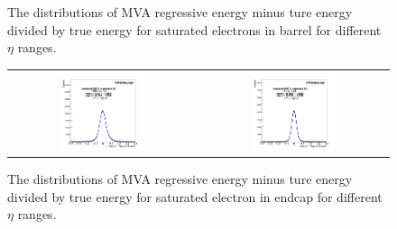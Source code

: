 \begin{figure}[bh]
\begin{center}
\begin{tabular}{cc}
    \end{tabular}
    \caption{ The distributions of MVA regressive energy minus ture energy divided by true energy for saturated electrons in barrel for different $\eta$ ranges.}
    \label{fig:result_B123}
  \end{center}
\end{figure}


\begin{figure}[bh]
  \begin{center}
    \begin{tabular}{cc}
      \includegraphics[width=0.45\textwidth]{chapters/Zprime/Saturation/images/FlatPt/Result/Barrel123_Endcap12/fit_BDTG_Barrel123_Endcap12_Eeta1_reg_s.png} &
      \includegraphics[width=0.45\textwidth]{chapters/Zprime/Saturation/images/FlatPt/Result/Barrel123_Endcap12/fit_BDTG_Barrel123_Endcap12_Eeta2_reg_s.png} \\
    \end{tabular}
    \caption{ The distributions of MVA regressive energy minus ture energy divided by true energy for saturated electron in endcap for different $\eta$ ranges.}
    \label{fig:result_E12}
  \end{center}
\end{figure}


